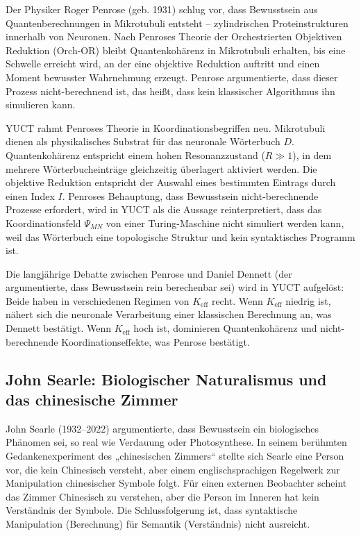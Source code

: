 \documentclass[12pt,a4paper]{article}
\begin{document}
	Der Physiker Roger Penrose (geb. 1931) schlug vor, dass Bewusstsein aus Quantenberechnungen in Mikrotubuli entsteht – zylindrischen Proteinstrukturen innerhalb von Neuronen. Nach Penroses Theorie der Orchestrierten Objektiven Reduktion (Orch-OR) bleibt Quantenkohärenz in Mikrotubuli erhalten, bis eine Schwelle erreicht wird, an der eine objektive Reduktion auftritt und einen Moment bewusster Wahrnehmung erzeugt. Penrose argumentierte, dass dieser Prozess nicht-berechnend ist, das heißt, dass kein klassischer Algorithmus ihn simulieren kann.
	
	YUCT rahmt Penroses Theorie in Koordinationsbegriffen neu. Mikrotubuli dienen als physikalisches Substrat für das neuronale Wörterbuch \(D\). Quantenkohärenz entspricht einem hohen Resonanzzustand (\(R \gg 1\)), in dem mehrere Wörterbucheinträge gleichzeitig überlagert aktiviert werden. Die objektive Reduktion entspricht der Auswahl eines bestimmten Eintrags durch einen Index \(I\). Penroses Behauptung, dass Bewusstsein nicht-berechnende Prozesse erfordert, wird in YUCT als die Aussage reinterpretiert, dass das Koordinationsfeld \(\Psi_{MN}\) von einer Turing-Maschine nicht simuliert werden kann, weil das Wörterbuch eine topologische Struktur und kein syntaktisches Programm ist.
	
	Die langjährige Debatte zwischen Penrose und Daniel Dennett (der argumentierte, dass Bewusstsein rein berechenbar sei) wird in YUCT aufgelöst: Beide haben in verschiedenen Regimen von \(K_{\mathrm{eff}}\) recht. Wenn \(K_{\mathrm{eff}}\) niedrig ist, nähert sich die neuronale Verarbeitung einer klassischen Berechnung an, was Dennett bestätigt. Wenn \(K_{\mathrm{eff}}\) hoch ist, dominieren Quantenkohärenz und nicht-berechnende Koordinationseffekte, was Penrose bestätigt.
	
	\subsection{John Searle: Biologischer Naturalismus und das chinesische Zimmer}
	
	John Searle (1932–2022) argumentierte, dass Bewusstsein ein biologisches Phänomen sei, so real wie Verdauung oder Photosynthese. In seinem berühmten Gedankenexperiment des „chinesischen Zimmers“ stellte sich Searle eine Person vor, die kein Chinesisch versteht, aber einem englischsprachigen Regelwerk zur Manipulation chinesischer Symbole folgt. Für einen externen Beobachter scheint das Zimmer Chinesisch zu verstehen, aber die Person im Inneren hat kein Verständnis der Symbole. Die Schlussfolgerung ist, dass syntaktische Manipulation (Berechnung) für Semantik (Verständnis) nicht ausreicht.
	
\end{document}
